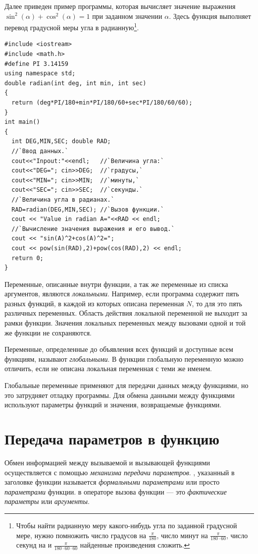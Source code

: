Далее приведен пример программы, которая вычисляет значение выражения  
$\sin^2(\alpha)+\cos^2(\alpha)=1$ при заданном значении  $\alpha$. Здесь функция  выполняет
перевод градусной меры угла в радианную\footnote{Чтобы найти радианную меру какого-нибудь угла по заданной градусной
мере, нужно помножить число градусов на  $\frac{\pi}{180}$, число минут на  $\frac{\pi}{180\cdot 60}$, число секунд
на и  $\frac{\pi}{180\cdot 60\cdot 60}$ найденные произведения сложить.}.
\begin{lstlisting}
#include <iostream>
#include <math.h>
#define PI 3.14159
using namespace std;
double radian(int deg, int min, int sec)
{
  return (deg*PI/180+min*PI/180/60+sec*PI/180/60/60);
}
int main()
{
  int DEG,MIN,SEC; double RAD;
  //`Ввод данных.`
  cout<<"Inpout:"<<endl;   //`Величина угла:`
  cout<<"DEG="; cin>>DEG;  //`градусы,`
  cout<<"MIN="; cin>>MIN;  //`минуты,`
  cout<<"SEC="; cin>>SEC;  //`секунды.`
  //`Величина угла в радианах.`
  RAD=radian(DEG,MIN,SEC); //`Вызов функции.`
  cout << "Value in radian A="<<RAD << endl;
  //`Вычисление значения выражения и его вывод.`
  cout << "sin(A)^2+cos(A)^2=";
  cout << pow(sin(RAD),2)+pow(cos(RAD),2) << endl;
  return 0;
}
\end{lstlisting}


Переменные, описанные внутри функции, а так же переменные из списка аргументов, являются
\emph{локальными}. Например, если программа содержит пять разных функций, в
каждой из которых описана переменная $N$, то для  это пять различных переменных. Область действия локальной переменной
не выходит за рамки функции. Значения локальных переменных между вызовами одной и той же функции не сохраняются. 

Переменные, определенные до объявления всех функций и доступные всем функциям, называют
\emph{глобальными}. В функции глобальную переменную можно отличить, если не
описана локальная переменная с теми же именем.

Глобальные переменные применяют для передачи данных между функциями, но это затрудняет отладку программы. Для обмена
данными между функциями используют параметры функций и значения, возвращаемые функциями.

\section[Передача параметров в функцию]{Передача параметров в функцию}
Обмен информацией между вызываемой и вызывающей функциями осуществляется с помощью \emph{механизма передачи параметров}. , указанный в
заголовке функции называется \emph{формальными параметрами} или просто
\emph{параметрами} функции.  в операторе вызова функции --- это
\emph{фактические параметры} или \emph{аргументы}. 

